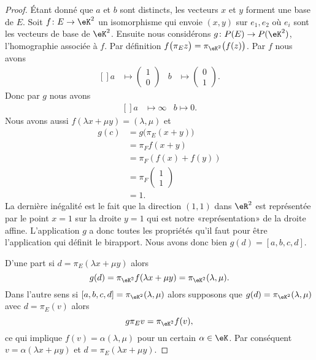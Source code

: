 \begin{proof}
	Étant donné que \( a\) et \( b\) sont distincts, les vecteurs \( x\) et \( y\) forment une base de \( E\). Soit \( f\colon E\to \eK^2\) un isomorphisme qui envoie \( (x,y)\) sur \( e_1,e_2\) où \( e_i\) sont les vecteurs de base de \( \eK^2\). Ensuite nous considérons  \( g\colon P(E)\to P(\eK^2)\), l'homographie associée à \( f\). Par définition \( f\big( \pi_Ez \big)=\pi_{\eK^2}\big( f(z) \big)\). Par \( f\) nous avons
	\begin{equation}
		\begin{aligned}[]
			a & \mapsto \begin{pmatrix}
				1 \\
				0
			\end{pmatrix}
			  & b                                   & \mapsto\begin{pmatrix}
				0 \\
				1
			\end{pmatrix}.
		\end{aligned}
	\end{equation}
	Donc par \( g\) nous avons
	\begin{equation}
		\begin{aligned}[]
			a & \mapsto\infty &
			b\mapsto 0.
		\end{aligned}
	\end{equation}
	Nous avons aussi \( f(\lambda x+\mu y)=(\lambda,\mu)\) et
	\begin{subequations}
		\begin{align}
			g(c) & =g\big( \pi_E(x+y) \big)          \\
			     & =\pi_Ff(x+y)                      \\
			     & =\pi_F(f(x)+f(y))                 \\
			     & =\pi_F\begin{pmatrix}
				1 \\
				1
			\end{pmatrix} \\
			     & =1.
		\end{align}
	\end{subequations}
	La dernière inégalité est le fait que la direction \( (1,1)\) dans \( \eR^2\) est représentée par le point \( x=1\) sur la droite \( y=1\) qui est notre «représentation» de la droite affine. L'application \( g\) a donc toutes les propriétés qu'il faut pour être l'application qui définit le birapport. Nous avons donc bien \( g(d)=[a,b,c,d]\).

	D'une part si \( d=\pi_E(\lambda x+\mu y)\) alors
	\begin{equation}
		g(d)=\pi_{\eK^2}f(\lambda x+\mu y)=\pi_{\eK^2}(\lambda,\mu).
	\end{equation}
	Dans l'autre sens si \( [a,b,c,d]=\pi_{\eK^2}(\lambda,\mu)\) alors supposons que \( g(d)=\pi_{\eK^2}(\lambda,\mu)\) avec \( d=\pi_E(v)\) alors
	\begin{equation}
		g\pi_Ev=\pi_{\eK^2}f(v),
	\end{equation}
	ce qui implique \( f(v)=\alpha(\lambda,\mu)\) pour un certain \( \alpha\in \eK\). Par conséquent \( v=\alpha(\lambda x+\mu y)\) et \( d=\pi_E(\lambda x+\mu y)\).
\end{proof}

